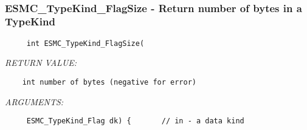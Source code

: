  
\setlength{\oldparskip}{\parskip}
\setlength{\parskip}{1.5ex}
\setlength{\oldparindent}{\parindent}
\setlength{\parindent}{0pt}
\setlength{\oldbaselineskip}{\baselineskip}
\setlength{\baselineskip}{11pt}
 
\def\bv{\begin{verbatim}}
\def\ev{\end{verbatim}}
\def\be{\begin{equation}}
\def\ee{\end{equation}}
\def\bea{\begin{eqnarray}}
\def\eea{\end{eqnarray}}
\def\bi{\begin{itemize}}
\def\ei{\end{itemize}}
\def\bn{\begin{enumerate}}
\def\en{\end{enumerate}}
\def\bd{\begin{description}}
\def\ed{\end{description}}
\def\({\left (}
\def\){\right )}
\def\[{\left [}
\def\]{\right ]}
\def\<{\left  \langle}
\def\>{\right \rangle}
\def\cI{{\cal I}}
\def\diag{\mathop{\rm diag}}
\def\tr{\mathop{\rm tr}}


 

  
 
\mbox{}\hrulefill\
 
\subsubsection [ESMC\_TypeKind\_FlagSize] {ESMC\_TypeKind\_FlagSize - Return number of bytes in a TypeKind}


  
\begin{verbatim}     int ESMC_TypeKind_FlagSize(\end{verbatim}{\em RETURN VALUE:}
\begin{verbatim}    int number of bytes (negative for error)\end{verbatim}{\em ARGUMENTS:}
\begin{verbatim}     ESMC_TypeKind_Flag dk) {       // in - a data kind\end{verbatim}
 
